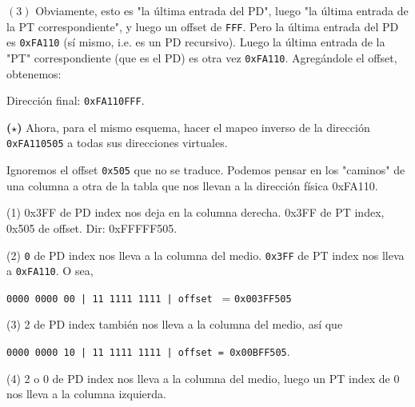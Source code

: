 \documentclass[12pt]{article}
\theoremstyle{definition}
\begin{document}
$(3)$ Obviamente, esto es "la última entrada del PD", luego "la última entrada
de la PT correspondiente", y luego un offset de \texttt{FFF}. Pero la última
entrada del PD es \texttt{0xFA110} (sí mismo, i.e. es un PD recursivo). Luego la
última entrada de la "PT" correspondiente (que es el PD) es otra vez
\texttt{0xFA110}. Agregándole el offset, obtenemos:

Dirección final: \texttt{0xFA110FFF}.

\begin{shaded}
    \textbf{($\star$)} Ahora, para el mismo esquema, hacer el mapeo inverso de
    la dirección \texttt{0xFA110505} a todas sus direcciones virtuales.
\end{shaded}

Ignoremos el offset \texttt{0x505} que no se  traduce. Podemos pensar en los
"caminos" de una columna a otra de la tabla que nos llevan a la dirección física
0xFA110. 

(1) 0x3FF de PD index nos deja en la columna derecha. 0x3FF de PT index, 0x505 de offset. Dir: 0xFFFFF505.

(2) \texttt{0} de PD index nos lleva a la columna del medio. \texttt{0x3FF}
de PT index nos lleva a \texttt{0xFA110}. O sea, 

\texttt{0000 0000 00 | 11 1111 1111 | offset   } = \texttt{0x003FF505}

(3) 2 de PD index también nos lleva a la columna del medio, así que 

\texttt{0000 0000 10 | 11 1111 1111 | offset = 0x00BFF505}.

(4) 2 o 0 de PD index nos lleva a la columna del medio, luego un PT index de 0
nos lleva a la columna izquierda.
\end{document}
